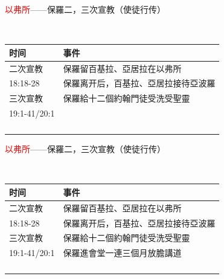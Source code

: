 \documentclass{beamer}
\begin{document}
\begin{frame}{\textcolor{red}{以弗所}——保羅二，三次宣教（使徒行传）}
\begin{block}{}\\
\begin{table}
\centering
\begin{tabular}{l|l}
时间 & 事件 \\\hline\hline
二次宣教&保羅留百基拉、亞居拉在以弗所 \\
18:18-28&保羅离开后，百基拉、亞居拉接待亞波羅 \\\hline\hline
三次宣教&保羅給十二個約翰門徒受洗受聖靈\\
19:1-41/20:1&\\
&\\
&\\
&\\
&\\\hline\hline
\end{tabular}
\end{table}
\end{block}
\end{frame}


\begin{frame}{\textcolor{red}{以弗所}——保羅二，三次宣教（使徒行传）}
\begin{block}{}\\
\begin{table}
\centering
\begin{tabular}{l|l}
时间 & 事件 \\\hline\hline
二次宣教&保羅留百基拉、亞居拉在以弗所 \\
18:18-28&保羅离开后，百基拉、亞居拉接待亞波羅 \\\hline\hline
三次宣教&保羅給十二個約翰門徒受洗受聖靈\\
19:1-41/20:1&保羅進會堂一連三個月放膽講道\\
&\\
&\\
&\\
&\\\hline\hline
\end{tabular}
\end{table}
\end{block}
\end{frame}
\end{document}
